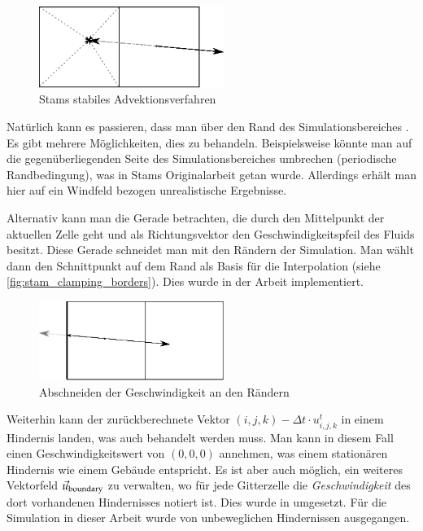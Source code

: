 \begin{figure}[ht]
\centering
\includegraphics[width=6cm]{images/advection_good}
\caption{Stams stabiles Advektionsverfahren}
\label{fig:stam_good_advection}
\end{figure}

Natürlich kann es passieren, dass man über den Rand des Simulationsbereiches
. Es gibt mehrere Möglichkeiten, dies zu behandeln.
Beispielsweise könnte man auf die gegenüberliegenden Seite des
Simulationsbereiches umbrechen (periodische Randbedingung), was in
Stams Originalarbeit getan wurde. Allerdings erhält man hier auf ein
Windfeld bezogen unrealistische Ergebnisse.

Alternativ kann man die Gerade betrachten, die durch den Mittelpunkt
der aktuellen Zelle geht und als Richtungsvektor den
Geschwindigkeitspfeil des Fluids besitzt. Diese Gerade schneidet man
mit den Rändern der Simulation. Man wählt dann den Schnittpunkt auf
dem Rand als Basis für die Interpolation (siehe
\autoref{fig:stam_clamping_borders}). Dies wurde in der Arbeit
implementiert.

\begin{figure}[ht]
\centering
\includegraphics[width=6cm]{images/advection_clamping_borders}
\caption{Abschneiden der Geschwindigkeit an den Rändern}
\label{fig:stam_clamping_borders}
\end{figure}

Weiterhin kann der zurückberechnete Vektor $(i,j,k) - \Delta t \cdot
u_{i,j,k}^t$ in einem Hindernis landen, was auch behandelt werden
muss. Man kann in diesem Fall einen Geschwindigkeitswert von $(0,0,0)$
annehmen, was einem stationären Hindernis wie einem Gebäude
entspricht. Es ist aber auch möglich, ein weiteres Vektorfeld
$\vec{u}_{\textnormal{boundary}}$ zu verwalten, wo für jede
Gitterzelle die \emph{Geschwindigkeit} des dort vorhandenen
Hindernisses notiert ist. Dies wurde in \cite{Crane2007}
umgesetzt. Für die Simulation in dieser Arbeit wurde von unbeweglichen
Hindernissen ausgegangen.

